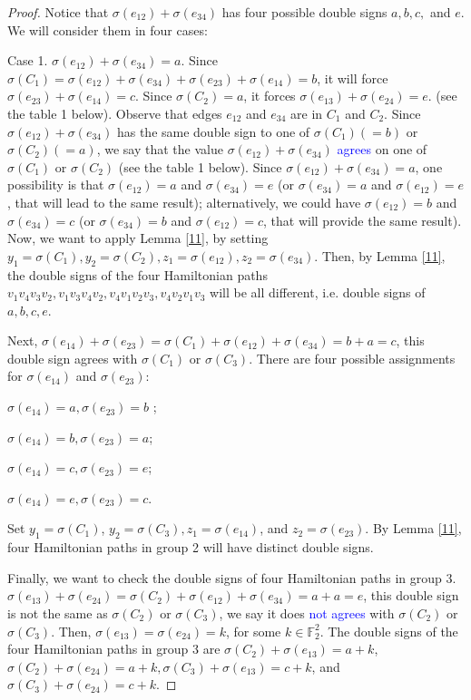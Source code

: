 \documentclass[12pt]{amsart}
\theoremstyle{plain}
\theoremstyle{definition}%
\begin{document}
\begin{proof}
Notice that $\sigma(e_{12})+\sigma(e_{34})$ has four possible double signs $a,b,c,$ and $e$. We will consider them in four cases:

Case 1.  $\sigma(e_{12})+\sigma(e_{34})=a$.
Since $\sigma(C_1)=\sigma(e_{12})+\sigma(e_{34})+\sigma(e_{23})+\sigma(e_{14})=b$, 
it will force $\sigma(e_{23})+\sigma(e_{14})=c$. Since $\sigma(C_2)=a$, it forces $\sigma(e_{13})+\sigma(e_{24})=e$. (see the table 1 below).
Observe that edges $e_{12}$ and $e_{34}$ are in $C_1$ and $C_2$.
Since $\sigma(e_{12})+\sigma(e_{34})$ has the same double sign to one of $\sigma(C_1)(=b)$ or $\sigma(C_2)(=a)$, we say that the value $\sigma(e_{12})+\sigma(e_{34})$ \textcolor{blue}{agrees} on one of $\sigma(C_1)$ or $\sigma(C_2)$ (see the table 1 below). 
Since $\sigma(e_{12})+\sigma(e_{34})=a$, one possibility is that $\sigma(e_{12})=a$ and $\sigma(e_{34})=e$ (or  $\sigma(e_{34})=a$ and $\sigma(e_{12})=e$, that will lead to the same result); alternatively, we could have $\sigma(e_{12})=b$ and $\sigma(e_{34})=c$ (or  $\sigma(e_{34})=b$ and $\sigma(e_{12})=c$, that will provide the same result).  Now,  we want to apply Lemma \ref{11}, by setting $y_1=\sigma(C_1), y_2=\sigma(C_2), z_1=\sigma(e_{12}), z_2=\sigma(e_{34})$. Then, 
by Lemma \ref{11}, the double signs of the four Hamiltonian paths $v_1v_4v_3v_2, v_1v_3v_4v_2, v_4v_1v_2v_3, v_4v_2v_1v_3$ will be all different, i.e. double signs of $a,b,c,e$. 

Next,  $\sigma(e_{14})+\sigma(e_{23})=\sigma(C_1)+\sigma(e_{12})+\sigma(e_{34})=b+a=c$, this double sign agrees with $\sigma(C_1)$ or $\sigma(C_3)$. There are four possible assignments for $\sigma(e_{14})$ and $\sigma(e_{23})$: 

 $\sigma(e_{14})=a, \sigma(e_{23})=b$ ;
 
$\sigma(e_{14})=b, \sigma(e_{23})=a$;

 $\sigma(e_{14})=c, \sigma(e_{23})=e$;
 
 $\sigma(e_{14})=e, \sigma(e_{23})=c$.

\vspace{0.5cm}
Set $y_1=\sigma(C_1)$, $y_2=\sigma(C_3), z_1=\sigma(e_{14})$, and $z_2=\sigma(e_{23})$. By Lemma \ref{11}, four Hamiltonian paths in group 2 will have distinct double signs.

Finally, we want to check the double signs of four Hamiltonian paths in group 3. 
$\sigma(e_{13})+\sigma(e_{24})=\sigma(C_2)+\sigma(e_{12})+\sigma(e_{34})=a+a=e$, this double sign is not the same as $\sigma(C_2)$ or $\sigma(C_3)$, we say it does  \textcolor{blue}{not agrees} with $\sigma(C_2)$ or $\sigma(C_3)$. 
Then, $\sigma(e_{13})=\sigma(e_{24})=k$, for some $k\in \mathbb{F}_2^2$. The double signs of the four Hamiltonian paths in group 3 are  $\sigma(C_2)+\sigma(e_{13})=a+k$, $\sigma(C_2)+\sigma(e_{24})=a+k, \sigma(C_3)+\sigma(e_{13})=c+k$, and $\sigma(C_3)+\sigma(e_{24})=c+k$.  


\end{proof}
\end{document}
